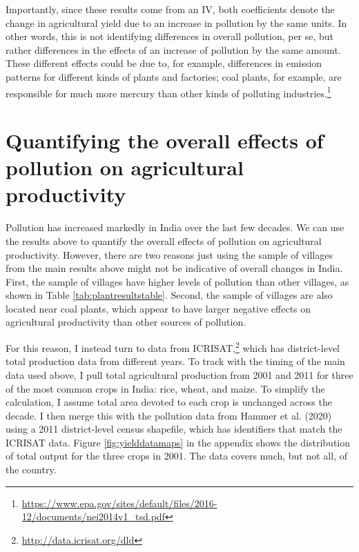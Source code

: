 \documentclass[
]{article}
\begin{document}
Importantly, since these results come from an IV, both coefficients denote the change in agricultural yield due to an increase in pollution by the same units. In other words, this is not identifying differences in overall pollution, per se, but rather differences in the effects of an increase of pollution by the same amount. These different effects could be due to, for example, differences in emission patterns for different kinds of plants and factories; coal plants, for example, are responsible for much more mercury than other kinds of polluting industries.\footnote{\url{https://www.epa.gov/sites/default/files/2016-12/documents/nei2014v1_tsd.pdf}}

\hypertarget{quantifying-the-overall-effects-of-pollution-on-agricultural-productivity}{%
\section{Quantifying the overall effects of pollution on agricultural productivity}\label{quantifying-the-overall-effects-of-pollution-on-agricultural-productivity}}

Pollution has increased markedly in India over the last few decades. We can use the results above to quantify the overall effects of pollution on agricultural productivity. However, there are two reasons just using the sample of villages from the main results above might not be indicative of overall changes in India. First, the sample of villages have higher levels of pollution than other villages, as shown in Table \ref{tab:plantresultstable}. Second, the sample of villages are also located near coal plants, which appear to have larger negative effects on agricultural productivity than other sources of pollution.

For this reason, I instead turn to data from ICRISAT,\footnote{\url{http://data.icrisat.org/dld}} which has district-level total production data from different years. To track with the timing of the main data used above, I pull total agricultural production from 2001 and 2011 for three of the most common crops in India: rice, wheat, and maize. To simplify the calculation, I assume total area devoted to each crop is unchanged across the decade. I then merge this with the pollution data from Hammer et al. (2020) using a 2011 district-level census shapefile, which has identifiers that match the ICRISAT data. Figure \ref{fig:yielddatamaps} in the appendix shows the distribution of total output for the three crops in 2001. The data covers much, but not all, of the country.
\end{document}
